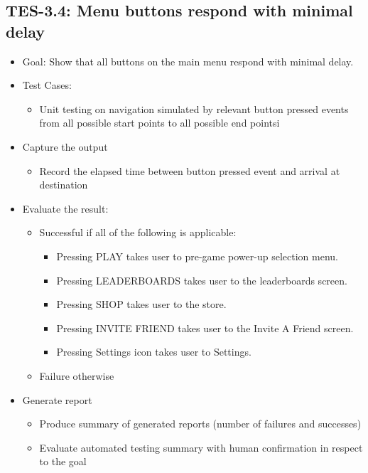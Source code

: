 \subsection{TES-3.4: Menu buttons respond with minimal delay}
\begin{itemize}
\item Goal: Show that all buttons on the main menu respond with minimal delay.

\item Test Cases: 
\begin{itemize}
\item Unit testing on navigation simulated by relevant button pressed events from all possible start points to all possible end pointsi
\end{itemize}

\item Capture the output
\begin{itemize}
\item Record the elapsed time between button pressed event and arrival at destination
\end{itemize}

\item Evaluate the result: 
\begin{itemize}
\item Successful if all of the following is applicable:
\begin{itemize}
\item Pressing PLAY takes user to pre-game power-up selection menu.
\item Pressing LEADERBOARDS takes user to the leaderboards screen.
\item Pressing SHOP takes user to the store.
\item Pressing INVITE FRIEND takes user to the Invite A Friend screen.
\item Pressing Settings icon takes user to Settings.
\end{itemize}
\item Failure otherwise
\end{itemize}

\item Generate report
\begin{itemize}
\item Produce summary of generated reports (number of failures and successes)
\item Evaluate automated testing summary with human confirmation in respect to the goal
\end{itemize}
\end{itemize}

